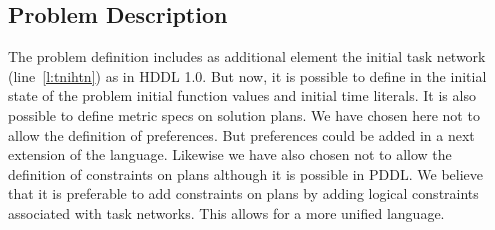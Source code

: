 \documentclass[letterpaper]{article} %
\begin{document}


\subsection{Problem Description}

%
%
The problem definition includes as additional element the initial task network (line~\ref{l:tnihtn}) as in HDDL 1.0. But now, it is possible to define in the initial state of the problem initial function values and initial time literals. It is also possible to define metric specs on solution plans. We have chosen here not to allow the definition of preferences. But preferences could be added in a next extension of the language. Likewise we have also chosen not to allow the definition of constraints on plans although it is possible in PDDL. We believe that it is preferable to add constraints on plans by adding logical constraints associated with task networks. This allows for a more unified language.
\end{document}
